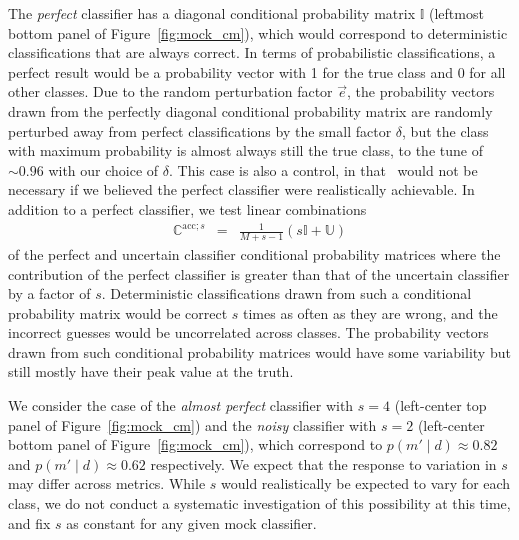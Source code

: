 The \textit{perfect} classifier has a diagonal conditional probability matrix $\mathbb{I}$ (leftmost bottom panel of Figure~\ref{fig:mock_cm}), which would correspond to deterministic classifications that are always correct.
In terms of probabilistic classifications, a perfect result would be a probability vector with 1 for the true class and 0 for all other classes.
Due to the random perturbation factor $\vec{e}$, the probability vectors drawn from the perfectly diagonal conditional probability matrix are randomly perturbed away from perfect classifications by the small factor $\delta$, but the class with maximum probability is almost always still the true class, to the tune of $\sim0.96$ with our choice of $\delta$.
This case is also a control, in that \plasticc\ would not be necessary if we believed the perfect classifier were realistically achievable.
In addition to a perfect classifier, we test linear combinations
\begin{eqnarray}
  \label{eq:lincomb}
  \mathbb{C}^{\mathrm{acc}; s} &=& \frac{1}{M+s-1} \left(s\mathbb{I} + \mathbb{U}\right)
\end{eqnarray}
of the perfect and uncertain classifier conditional probability matrices where the contribution of the perfect classifier is greater than that of the uncertain classifier by a factor of $s$.
Deterministic classifications drawn from such a conditional probability matrix would be correct $s$ times as often as they are wrong, and the incorrect guesses would be uncorrelated across classes.
The probability vectors drawn from such conditional probability matrices would have some variability but still mostly have their peak value at the truth.

We consider the case of the \textit{almost perfect} classifier with $s=4$ (left-center top panel of Figure~\ref{fig:mock_cm}) and the \textit{noisy} classifier with $s=2$ (left-center bottom panel of Figure~\ref{fig:mock_cm}), which correspond to $p(m' \mid d)\approx0.82$ and $p(m' \mid d)\approx0.62$ respectively. We expect that the response to variation in $s$ may differ across metrics.
While $s$ would realistically be expected to vary for each class, we do not conduct a systematic investigation of this possibility at this time, and fix $s$ as constant for any given mock classifier.

